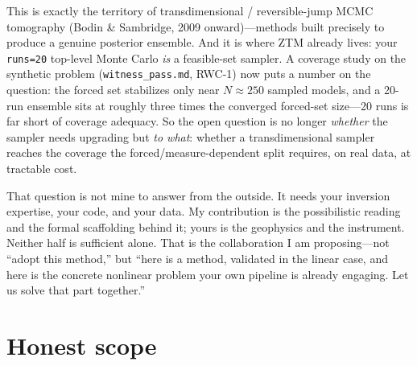 \documentclass[11pt]{article}
\newcommand{\file}[1]{\texttt{#1}}
\begin{document}
This is exactly the territory of transdimensional / reversible-jump MCMC
tomography (Bodin \& Sambridge, 2009 onward)---methods built precisely to
produce a genuine posterior ensemble. And it is where ZTM already lives: your
\file{runs=20} top-level Monte Carlo \emph{is} a feasible-set sampler. A
coverage study on the synthetic problem (\file{witness\_pass.md}, RWC-1) now
puts a number on the question: the forced set stabilizes only near
$N \approx 250$ sampled models, and a 20-run ensemble sits at roughly three
times the converged forced-set size---20 runs is far short of coverage
adequacy. So the open question is no longer \emph{whether} the sampler needs
upgrading but \emph{to what}: whether a transdimensional sampler reaches the
coverage the forced/measure-dependent split requires, on real data, at
tractable cost.

That question is not mine to answer from the outside. It needs your inversion
expertise, your code, and your data. My contribution is the possibilistic
reading and the formal scaffolding behind it; yours is the geophysics and the
instrument. Neither half is sufficient alone. That is the collaboration I am
proposing---not ``adopt this method,'' but ``here is a method, validated in the
linear case, and here is the concrete nonlinear problem your own pipeline is
already engaging. Let us solve that part together.''

\section{Honest scope}
\end{document}
